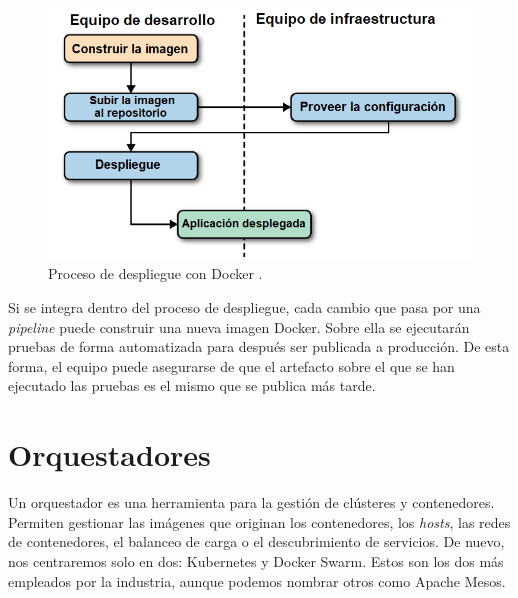 \documentclass[11pt,spanish,listoffigures]{tfgetsinf}
\begin{document}
\begin{figure}[h]
\centering
\includegraphics[scale=0.7]{docker_process_ES}
\caption{Proceso de despliegue con Docker \cite{Matthias}.}
\label{fig:docker_process_ES}
\end{figure}

Si se integra dentro del proceso de despliegue, cada cambio que pasa por una \textit{pipeline} puede construir una nueva imagen Docker. Sobre ella se ejecutarán pruebas de forma automatizada para después ser publicada a producción. De esta forma, el equipo puede asegurarse de que el artefacto sobre el que se han ejecutado las pruebas es el mismo que se publica más tarde. 

\newpage

\section{Orquestadores}

Un orquestador \cite{DelaTorre2018} es una herramienta para la gestión de clústeres y contenedores. Permiten gestionar las imágenes que originan los contenedores, los \textit{hosts}, las redes de contenedores, el balanceo de carga o el descubrimiento de servicios. De nuevo, nos centraremos solo en dos: Kubernetes y Docker Swarm. Estos son los dos más empleados por la industria, aunque podemos nombrar otros como  Apache Mesos.
\end{document}
